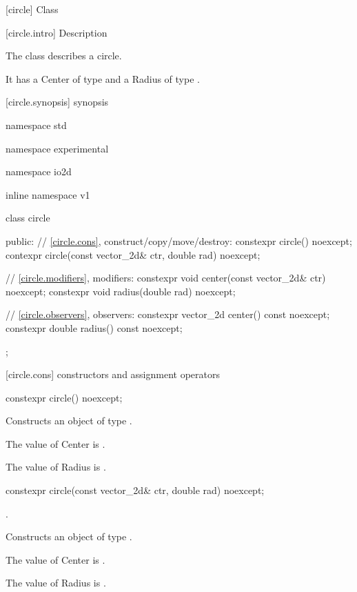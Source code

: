  [circle] {Class }

 [circle.intro] { Description}

\pnum
{}
The class  describes a circle.

\pnum
It has a Center of type  and a Radius of type .

 [circle.synopsis] { synopsis}

\begin{codeblock}
namespace std { namespace experimental { namespace io2d { inline namespace v1 {
  class circle {
  public:
    // \ref{circle.cons}, construct/copy/move/destroy:
    constexpr circle() noexcept;
    contexpr circle(const vector_2d& ctr, double rad) noexcept;

    // \ref{circle.modifiers}, modifiers:
    constexpr void center(const vector_2d& ctr) noexcept;
    constexpr void radius(double rad) noexcept;
    
    // \ref{circle.observers}, observers:
    constexpr vector_2d center() const noexcept;
    constexpr double radius() const noexcept;
  };
} } } }
\end{codeblock}

 [circle.cons] { constructors and assignment operators}

\begin{itemdecl}
constexpr circle() noexcept;
\end{itemdecl}
\begin{itemdescr}
\pnum
\effects
Constructs an object of type .

\pnum
The value of Center is .

\pnum
The value of Radius is .
\end{itemdescr}

\begin{itemdecl}
constexpr circle(const vector_2d& ctr, double rad) noexcept;
\end{itemdecl}
\begin{itemdescr}
\preconditions
{}.

\pnum
\effects
Constructs an object of type .

\pnum
The value of Center is .

\pnum
The value of Radius is .
\end{itemdescr}

